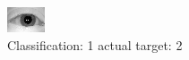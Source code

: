 \begin{figure}[h!]
\begin{center}
\includegraphics[width=0.60\columnwidth]{figures/ID961_class_1_target_2.png}
\end{center}
\caption{ Classification: 1 actual target: 2}
\label{fig:ID961_class_1_target_2}
\end{figure}
